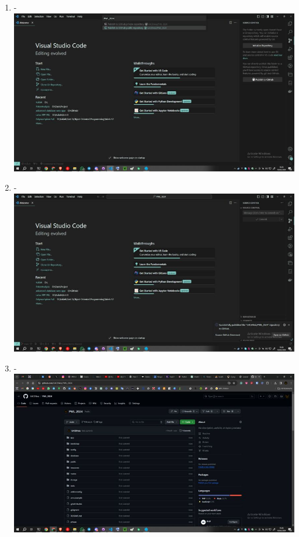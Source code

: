 \documentclass[12pt,titlepage]{article}
\begin{document}
\begin{enumerate}[label= \alph*.]
    \item - \\ \includegraphics[width=.9\textwidth]{images/figures/Github Publish 4.jpg}
    \newpage
    \item - \\ \includegraphics[width=.9\textwidth]{images/figures/Github Publish 5.jpg}
    \item - \\ \includegraphics[width=.9\textwidth]{images/figures/Github Publish 6.jpg}
\end{enumerate}

\newpage
\end{document}
